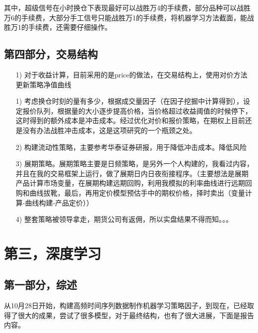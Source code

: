 \documentclass[11pt]{ctexart}
\begin{document}
其中，超级信号在小时换仓下表现最好可以战胜万4的手续费，部分品种可以战胜万6的手续费，大部分手工信号只能战胜万1的手续费，将机器学习方法截面，能战胜万1的手续费，还需要仔细操作。

\subsection{第四部分，交易结构}
\begin{itemize}
  \item [1)]
  对于收益计算，目前采用的是price的做法，在交易结构上，使用对价方法更新策略净值曲线
  \item [1)]
  考虑换仓时刻的量有多少，根据成交量因子（在因子挖掘中计算得到），设定报价队列，根据量的大小逐步提高价格，当价格超过收益阈值的时候停下，这时得到的额外成本是冲击成本。经过优化对价和报价策略，在期权上目前还是没有办法战胜冲击成本，这是这项研究的一个瓶颈之处。
  \item [2)]
  构建流动性策略，主要参考华泰证券研报，用于降低冲击成本。降低风险
  \item [3)]
  展期策略。展期策略主要是日频策略，是另外一个人构建的，我看过内容，并且在我的交易框架上运行，做了展期日内日夜衔接程序。（主要想法是展期产品计算市场变量，在展期构建远期回购，利用我模拟的利率曲线进行远期回购和曲线拔靴，最后，再用定价模型预估手中的期权价格，择时卖出（变量计算-曲线构建-产品定价））
  \item [4)]
  整套策略被领导拿走，期货公司有返佣，所以实盘结果不得而知。。。

\end{itemize}

\section{第三，深度学习}
\subsection{第一部分，综述}
从10月28日开始，构建高频时间序列数据制作机器学习策略因子，到现在，已经取得了很大的成果，尝试了很多模型，对于最终结构，也有了很大进展，下面是报告内容。
\end{document}
